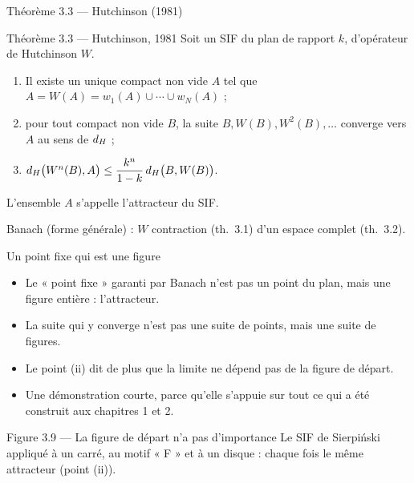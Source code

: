 \begin{frame}{Théorème 3.3 --- Hutchinson (1981)}
  \begin{Enonce}{Théorème 3.3 --- Hutchinson, 1981}
    \small Soit un SIF du plan de rapport $k$, d'opérateur de Hutchinson $W$.
    \begin{enumerate}
      \item[(i)] Il existe un unique compact non vide $A$ tel que
        $A = W(A) = w_1(A)\cup\cdots\cup w_N(A)$ ;
      \item[(ii)] pour tout compact non vide $B$, la suite
        $B,W(B),W^2(B),\ldots$ converge vers $A$ au sens de $d_H$ ;
      \item[(iii)] $d_H\big(W^n(B),A\big)\leq\dfrac{k^n}{1-k}\,d_H\big(B,W(B)\big)$.
    \end{enumerate}
    L'ensemble $A$ s'appelle l'attracteur du SIF.
  \end{Enonce}
  \begin{AuTableau}
    \small Banach (forme générale) : $W$ contraction (th.~3.1) d'un
    espace complet (th.~3.2).
  \end{AuTableau}
\end{frame}

\begin{frame}{Un point fixe qui est une figure}
  \small
  \begin{itemize}
    \item Le « point fixe » garanti par Banach n'est pas un point du
      plan, mais une figure entière : l'attracteur.
    \item La suite qui y converge n'est pas une suite de points, mais une
      suite de figures.
    \item Le point (ii) dit de plus que la limite ne dépend pas de la
      figure de départ.
    \item Une démonstration courte, parce qu'elle s'appuie sur tout ce
      qui a été construit aux chapitres 1 et 2.
  \end{itemize}
\end{frame}

\begin{frame}{Figure 3.9 --- La figure de départ n'a pas d'importance}
  \small Le SIF de Sierpiński appliqué à un carré, au motif « F » et à un
  disque : chaque fois le même attracteur (point (ii)).
\end{frame}

